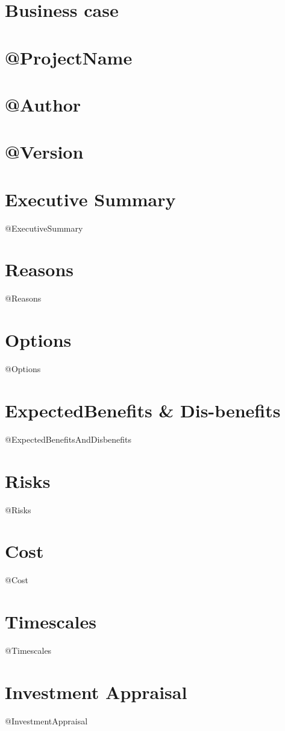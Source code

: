 \documentclass{report}
\begin{document}
\section{Business case}
\section{@ProjectName}
\date{\today}
\section{@Author}
\section{@Version}

\tableofcontents

\newpage


\section{Executive Summary}
@ExecutiveSummary

\section{Reasons}
@Reasons

\section{Options}
@Options

\section{ExpectedBenefits \& Dis-benefits }
@ExpectedBenefitsAndDisbenefits

\section{Risks}
@Risks

\section{Cost}
@Cost

\section{Timescales}
@Timescales

\section{Investment Appraisal}
@InvestmentAppraisal
\end{document}
